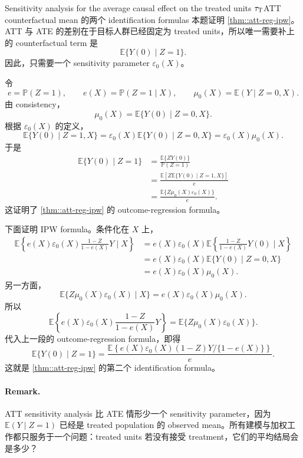 \begin{exercisesolution}{Sensitivity analysis for the average causal effect on the treated units $\tau_\textsc{T}$}{ATT counterfactual mean 的两个 identification formulas}
本题证明 \cref{thm::att-reg-ipw}。ATT 与 ATE 的差别在于目标人群已经固定为 treated units，所以唯一需要补上的 counterfactual term 是
\[
\mathbb{E}\{Y(0)\mid Z=1\}.
\]
因此，只需要一个 sensitivity parameter $\varepsilon_0(X)$。

令
\[
e=\mathbb{P}(Z=1),
\qquad
e(X)=\mathbb{P}(Z=1\mid X),
\qquad
\mu_0(X)=\mathbb{E}(Y\mid Z=0,X).
\]
由 consistency，
\[
\mu_0(X)=\mathbb{E}\{Y(0)\mid Z=0,X\}.
\]
根据 $\varepsilon_0(X)$ 的定义，
\[
\mathbb{E}\{Y(0)\mid Z=1,X\}
=
\varepsilon_0(X)\mathbb{E}\{Y(0)\mid Z=0,X\}
=
\varepsilon_0(X)\mu_0(X).
\]
于是
\begin{align*}
\mathbb{E}\{Y(0)\mid Z=1\}
&=
\frac{\mathbb{E}\{ZY(0)\}}{\mathbb{P}(Z=1)}\\
&=
\frac{\mathbb{E}\left[Z\mathbb{E}\{Y(0)\mid Z=1,X\}\right]}{e}\\
&=
\frac{\mathbb{E}\{Z\mu_0(X)\varepsilon_0(X)\}}{e}.
\end{align*}
这证明了 \cref{thm::att-reg-ipw} 的 outcome-regression formula。

下面证明 IPW formula。条件化在 $X$ 上，
\begin{align*}
\mathbb{E}\left\{
e(X)\varepsilon_0(X)\frac{1-Z}{1-e(X)}Y
\mid X
\right\}
&=
e(X)\varepsilon_0(X)
\mathbb{E}\left\{\frac{1-Z}{1-e(X)}Y(0)\mid X\right\}\\
&=
e(X)\varepsilon_0(X)
\mathbb{E}\{Y(0)\mid Z=0,X\}\\
&=
e(X)\varepsilon_0(X)\mu_0(X).
\end{align*}
另一方面，
\[
\mathbb{E}\{Z\mu_0(X)\varepsilon_0(X)\mid X\}
=
e(X)\varepsilon_0(X)\mu_0(X).
\]
所以
\[
\mathbb{E}\left\{
e(X)\varepsilon_0(X)\frac{1-Z}{1-e(X)}Y
\right\}
=
\mathbb{E}\{Z\mu_0(X)\varepsilon_0(X)\}.
\]
代入上一段的 outcome-regression formula，即得
\[
\mathbb{E}\{Y(0)\mid Z=1\}
=
\frac{
\mathbb{E}\left\{
e(X)\varepsilon_0(X)(1-Z)Y/\{1-e(X)\}
\right\}
}{e}.
\]
这就是 \cref{thm::att-reg-ipw} 的第二个 identification formula。

\paragraph{Remark.}
ATT sensitivity analysis 比 ATE 情形少一个 sensitivity parameter，因为 $\mathbb{E}(Y\mid Z=1)$ 已经是 treated population 的 observed mean。所有建模与加权工作都只服务于一个问题：treated units 若没有接受 treatment，它们的平均结局会是多少？
\end{exercisesolution}

